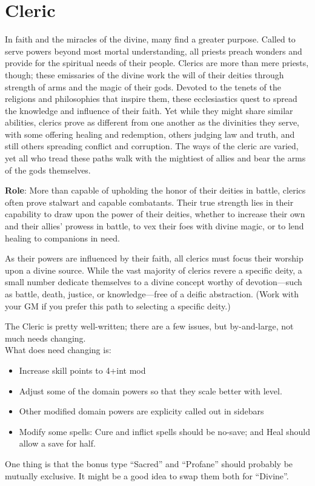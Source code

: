\section{Cleric}

\label{f0}				
In faith and the miracles of the divine, many find a greater purpose. Called to serve powers beyond most mortal
understanding, all priests preach wonders and provide for the spiritual needs of their people. Clerics are more
than mere priests, though; these emissaries of the divine work the will of their deities through strength of arms
and the magic of their gods. Devoted to the tenets of the religions and philosophies that inspire them, these
ecclesiastics quest to spread the knowledge and influence of their faith. Yet while they might share similar
abilities, clerics prove as different from one another as the divinities they serve, with some offering healing
and redemption, others judging law and truth, and still others spreading conflict and corruption. The ways of
the cleric are varied, yet all who tread these paths walk with the mightiest of allies and bear the arms of the
gods themselves.

\textbf{Role}: More than capable of upholding the honor of their deities in battle, clerics often prove stalwart
and capable combatants. Their true strength lies in their capability to draw upon the power of their deities,
whether to increase their own and their allies' prowess in battle, to vex their foes with divine magic, or to
lend healing to companions in need.

As their powers are influenced by their faith, all clerics must focus their worship upon a divine source. While
the vast majority of clerics revere a specific deity, a small number dedicate themselves to a divine concept
worthy of devotion---such as battle, death, justice, or knowledge---free of a deific abstraction. (Work with
your GM if you prefer this path to selecting a specific deity.)

\begin{formal}
 The Cleric is pretty well-written; there are a few issues, but by-and-large, not much needs changing.\\
 What does need changing is:
 \begin{itemize}
  \item Increase skill points to 4+int mod
  \item Adjust some of the domain powers so that they scale better with level.
  \item Other modified domain powers are explicity called out in sidebars
  \item Modify some spells: Cure and inflict spells should be no-save; and Heal should allow a save for half.
 \end{itemize}
 One thing is that the bonus type ``Sacred'' and ``Profane'' should probably be mutually exclusive. It might
 be a good idea to swap them both for ``Divine''.
\end{formal}


